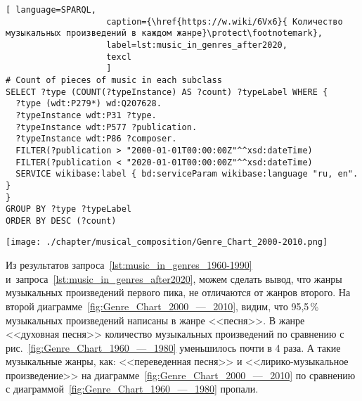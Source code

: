 \begin{lstlisting}[ language=SPARQL,
                    caption={\href{https://w.wiki/6Vx6}{ Количество музыкальных произведений в каждом жанре}\protect\footnotemark},
                    label=lst:music_in_genres_after2020,
                    texcl 
                    ]
# Count of pieces of music in each subclass
SELECT ?type (COUNT(?typeInstance) AS ?count) ?typeLabel WHERE {
  ?type (wdt:P279*) wd:Q207628.
  ?typeInstance wdt:P31 ?type.
  ?typeInstance wdt:P577 ?publication.
  ?typeInstance wdt:P86 ?composer.
  FILTER(?publication > "2000-01-01T00:00:00Z"^^xsd:dateTime)        
  FILTER(?publication < "2020-01-01T00:00:00Z"^^xsd:dateTime)
  SERVICE wikibase:label { bd:serviceParam wikibase:language "ru, en". }
}
GROUP BY ?type ?typeLabel
ORDER BY DESC (?count)
\end{lstlisting}%

\begin{marginfigure}[0\baselineskip]
	\texttt{[image: ./chapter/musical\_composition/Genre\_Chart\_2000-2010.png]}
	\caption{Круговая диаграмма числа музыкальных жанров за 2000--2010 годы во всем мире. Ссылка на SPARQL-запрос: \href{https://w.wiki/6Vx6}{https://w.wiki/6Vx6}.}%
	\label{fig:Genre_Chart_2000_—_2010}%
\end{marginfigure}

Из результатов запроса~\ref{lst:music_in_genres_1960-1990} 
и~запроса~\ref{lst:music_in_genres_after2020}, можем сделать вывод, 
что жанры музыкальных произведений первого пика, не отличаются от жанров второго. 
На второй диаграмме~\ref{fig:Genre_Chart_2000_—_2010}, видим, что 95,5\,\% музыкальных произведений написаны в жанре <<песня>>. В жанре <<духовная песня>> количество музыкальных произведений по сравнению с рис.~\ref{fig:Genre_Chart_1960_—_1980} уменьшилось почти в 4 раза. А такие музыкальные жанры, как: <<переведенная песня>> и <<лирико-музыкальное произведение>> на диаграмме~\ref{fig:Genre_Chart_2000_—_2010} по сравнению с диаграммой~\ref{fig:Genre_Chart_1960_—_1980} пропали.


